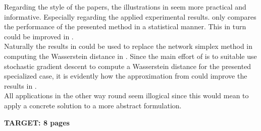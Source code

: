 \documentclass[twoside]{scrartcl}
\begin{document}
Regarding the style of the papers, the illustrations in \cite{B} seem more practical and informative. Especially regarding the applied experimental results. \cite{A} only compares the performance of the presented method in a statistical manner. This in turn could be improved in \cite{B}.\\

Naturally the results in \cite{C} could be used to replace the network simplex method in computing the Wasserstein distance in \cite{A}. Since the main effort of \cite{B} is to suitable use stochastic gradient descent to compute a Wasserstein distance for the presented specialized case, it is evidently how the approximation from \cite{C} could improve the results in \cite{B}.\\
All applications in the other way round seem illogical since this would mean to apply a concrete solution to a more abstract formulation.


%

\textbf{TARGET: 8 pages}

\newpage


\end{document}
